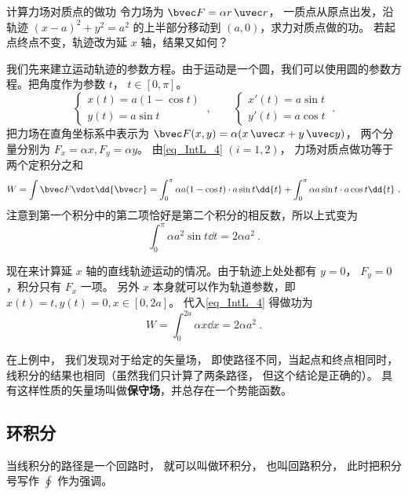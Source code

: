 \begin{example}{计算力场对质点的做功}\label{ex_IntL_1}
令力场为 $\bvec F = \alpha r \,\uvec r$， 一质点从原点出发，沿轨迹 $(x-a)^2 + y^2 = a^2$ 的上半部分移动到 $(a,0)$，求力对质点做的功。 若起点终点不变，轨迹改为延 $x$ 轴，结果又如何？

我们先来建立运动轨迹的参数方程。由于运动是一个圆，我们可以使用圆的参数方程。把角度作为参数 $t$， $t\in [0,\pi]$。
\begin{equation}
\begin{cases}
x(t) = a(1-\cos t)\\
y(t) = a \sin t
\end{cases}~,
\qquad 
\begin{cases}
x'(t) = a \sin t\\
y'(t) = a \cos t
\end{cases}~.
\end{equation}
把力场在直角坐标系中表示为 $\bvec F(x,y) = \alpha (x\,\uvec x + y\,\uvec y)$， 两个分量分别为 $F_x = \alpha x, F_y = \alpha y$。 由\autoref{eq_IntL_4} $(i=1,2)$， 力场对质点做功等于两个定积分之和
\begin{equation}
W = \int \bvec F \vdot \dd{\bvec r} =\int_0^\pi \alpha a(1-\cos t) \cdot a \sin t \dd{t} + \int_0^\pi \alpha a \sin t \cdot a \cos t \dd{t}~.
\end{equation}
注意到第一个积分中的第二项恰好是第二个积分的相反数，所以上式变为
\begin{equation}
\int_0^\pi \alpha a^2 \sin t \dd{t} =2 \alpha a^2~.
\end{equation}

现在来计算延 $x$ 轴的直线轨迹运动的情况。由于轨迹上处处都有 $y=0$， $F_y = 0$，积分只有 $F_x$ 一项。 另外 $x$ 本身就可以作为轨道参数，即 $x(t) = t, y(t) = 0, x\in [0, 2a]$。 代入\autoref{eq_IntL_4} 得做功为
\begin{equation}
W = \int_0^{2a} \alpha x \dd{x} = 2 \alpha a^2~.
\end{equation}
\end{example}

在上例中， 我们发现对于给定的矢量场， 即使路径不同，当起点和终点相同时， 线积分的结果也相同（虽然我们只计算了两条路径， 但这个结论是正确的）。 具有这样性质的矢量场叫做\textbf{保守场}，并总存在一个势能函数。 

\subsection{环积分}

当线积分的路径是一个回路时， 就可以叫做环积分， 也叫回路积分， 此时把积分号写作 $\oint$ 作为强调。
